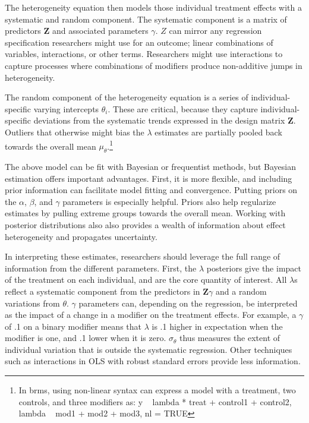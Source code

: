 \documentclass[12pt]{article}
\begin{document}
The heterogeneity equation then models those individual treatment effects with a systematic and random component. 
The systematic component is a matrix of predictors \textbf{Z} and associated parameters $\gamma$. 
$Z$ can mirror any regression specification researchers might use for an outcome; linear combinations of variables, interactions, or other terms. 
Researchers might use interactions to capture processes where combinations of modifiers produce non-additive jumps in heterogeneity. 


The random component of the heterogeneity equation is a series of individual-specific varying intercepts $\theta_i$.
These are critical, because they capture individual-specific deviations from the systematic trends expressed in the design matrix \textbf{Z}. 
Outliers that otherwise might bias the $\lambda$ estimates are partially pooled back towards the overall mean $\mu_\theta$.\footnote{In brms, using non-linear syntax can express a model with a treatment, two controls, and three modifiers as: y ~ lambda * treat + control1 + control2, lambda ~ mod1 + mod2 + mod3, nl = TRUE}


The above model can be fit with Bayesian or frequentist methods, but Bayesian estimation offers important advantages.
First, it is more flexible, and including prior information can facilitate model fitting and convergence. 
Putting priors on the $\alpha$, $\beta$, and $\gamma$ parameters is especially helpful.
Priors also help regularize estimates by pulling extreme groups towards the overall mean.
Working with posterior distributions also also provides a wealth of information about effect heterogeneity and propagates uncertainty.  


In interpreting these estimates, researchers should leverage the full range of information from the different parameters. 
First, the $\lambda$ posteriors give the impact of the treatment on each individual, and are the core quantity of interest. 
All $\lambda$s reflect a systematic component from the predictors in $\textbf{Z}\gamma$ and a random variations from $\theta$. 
$\gamma$ parameters can, depending on the regression, be interpreted as the impact of a change in a modifier on the treatment effects.
For example, a $\gamma$ of .1 on a binary modifier means that $\lambda$ is .1 higher in expectation when the modifier is one, and .1 lower when it is zero.
$\sigma_\theta$ thus measures the extent of individual variation that is outside the systematic regression. 
Other techniques such as interactions in OLS with robust standard errors provide less information.
\end{document}
